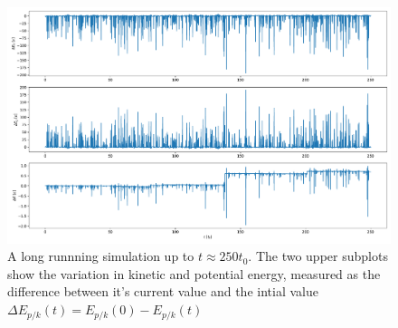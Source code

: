 \documentclass[a4paper, 12pt]{article}
\begin{document}
\begin{figure}[h!]
    \hspace{-1.6cm}
    \includegraphics[width=1.2\linewidth]{../Two-Dimensional-Gas/figures/100N_250t.pdf}
    \caption{A long runnning simulation up to $t \approx 250 t_0$. The two upper subplots show the variation in kinetic and potential energy, measured as the difference between it's current value and the intial value $\Delta E_{p/k}(t) = E_{p/k}(0) - E_{p/k}(t)$}
    \label{fig:100long}
\end{figure}
\end{document}
